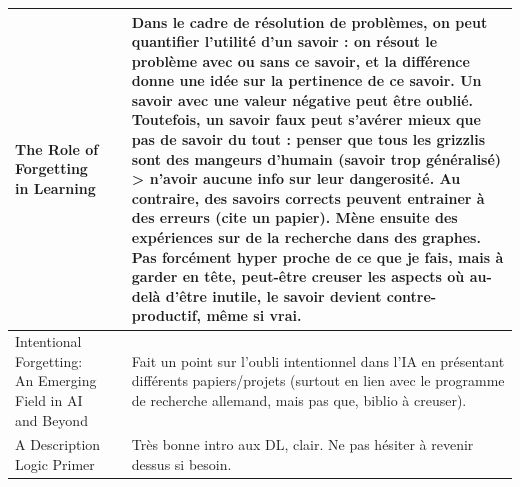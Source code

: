 \documentclass[french]{article}
\begin{document}
    \newpage
    \begin{table}[ht!]
        \begin{center}
        \begin{tabular}{|p{}|p{}|p{}|}
            \hline
            The  Role  of  Forgetting  in  Learning \cite{marcot_advances_2019}
            &
            & Dans le cadre de résolution de problèmes, on peut quantifier l'utilité d'un savoir : on résout le problème avec ou sans ce savoir, et la différence donne une idée sur la pertinence de ce savoir. Un savoir avec une valeur négative peut être oublié.
            Toutefois, un savoir faux peut s'avérer mieux que pas de savoir du tout : penser que tous les grizzlis sont des mangeurs d'humain (savoir trop généralisé) > n'avoir aucune info sur leur dangerosité. Au contraire, des savoirs corrects peuvent entrainer à des erreurs (cite un papier). Mène ensuite des expériences sur de la recherche dans des graphes. Pas forcément hyper proche de ce que je fais, mais à garder en tête, peut-être creuser les aspects où au-delà d'être inutile, le savoir devient contre-productif, même si vrai. \\
            \hline

            Intentional Forgetting: An Emerging Field in AI and Beyond \cite{beierle_intentional_2019}
            &
            & Fait un point sur l'oubli intentionnel dans l'IA en présentant différents papiers/projets (surtout en lien avec le programme de recherche allemand, mais pas que, biblio à creuser).\\
            \hline
            

            A Description Logic Primer \cite{krotzsch_description_2013}
            &
            & Très bonne intro aux DL, clair. Ne pas hésiter à revenir dessus si besoin.
            \\
            \hline


\end{tabular}
\end{center}
\end{table}
\end{document}
